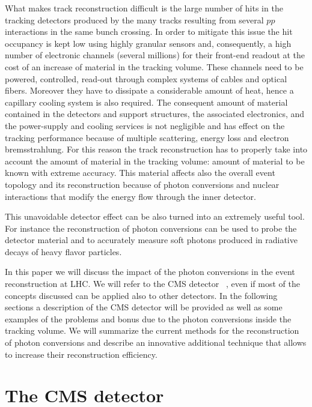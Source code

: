 \documentclass[a4paper]{jpconf}
\begin{document}
What makes  track reconstruction difficult is  
the large number of hits in the tracking detectors
produced by the many tracks resulting from several $pp$ interactions in the same bunch crossing. In order to mitigate this issue the hit occupancy is kept low using highly granular sensors and, consequently, a high number of electronic channels (several millions) for their front-end readout at the cost of an increase of material in the tracking volume. These channels need to be powered, controlled, read-out through  complex systems of cables and optical fibers. Moreover they have to dissipate a considerable amount of heat, hence a capillary cooling system is also required.
The consequent amount of material  contained in the detectors and support structures, the associated electronics, and the power-supply and cooling services is not negligible and has effect on the tracking performance because of multiple scattering, energy loss and electron bremsstrahlung. 
For this reason the track reconstruction has to properly take into account the amount of material in the tracking volume: amount of material to be known with extreme accuracy.  
This material  affects also the overall event topology and its reconstruction because of photon conversions and nuclear interactions that modify the energy flow through the inner detector.

This unavoidable detector effect   can be also turned into an extremely useful tool. For instance the reconstruction of photon conversions can be used to probe the detector material and to accurately measure soft photons produced in radiative decays of heavy flavor particles. %
 
In this paper we will discuss the impact of the photon conversions in the event reconstruction at LHC.  We will refer to the CMS detector~\cite{JINST} , even if most of the concepts discussed can be applied also to other detectors. 
In the following sections a description of the CMS detector will be provided as well as some examples of the  problems and bonus due to the photon conversions inside the tracking volume.
We will summarize the current methods for the reconstruction of photon conversions and describe an innovative additional technique that allows to increase their reconstruction efficiency.


\section{The CMS detector}
\end{document}
